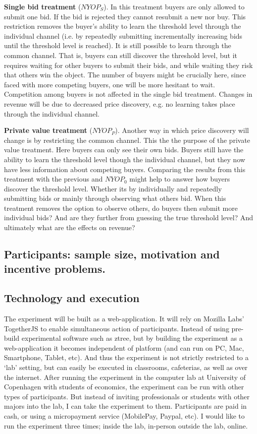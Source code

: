 \documentclass[a4paper,12pt]{article}
\begin{document}
	{\bf Single bid treatment} ($NYOP_S$).
	In this treatment buyers are only allowed to submit one bid. If the bid is rejected they cannot resubmit a new nor buy. This restriction removes the buyer's ability to learn the threshold level through the individual channel (i.e. by repeatedly submitting incrementally increasing bids until the threshold level is reached). It is still possible to learn through the common channel. That is, buyers can still discover the threshold level, but it requires waiting for other buyers to submit their bids, and while waiting they risk that others win the object. The number of buyers might be crucially here, since faced with more competing buyers, one will be more hesitant to wait. Competition among buyers is not affected in the single bid treatment. Changes in revenue will be due to decreased price discovery, e.g. no learning takes place through the individual channel.

	{\bf Private value treatment} ($NYOP_P$).
	Another way in which price discovery will change is by restricting the common channel. This the the purpose of the private value treatment. Here buyers can only see their own bids. Buyers still have the ability to learn the threshold level though the individual channel, but they now have less information about competing buyers. Comparing the results from this treatment with the previous and $NYOP_0$ might help to answer how buyers discover the threshold level. Whether its by individually and repeatedly submitting bids or mainly through observing what others bid. When this treatment removes the option to observe others, do buyers then submit more individual bids? And are they further from guessing the true threshold level? And ultimately what are the effects on revenue? 

	\subsection{Participants: sample size, motivation and incentive problems.}


	\subsection{Technology and execution}
	The experiment will be built as a web-application. It will rely on Mozilla Labs' TogetherJS to enable simultaneous action of participants. Instead of using pre-build experimental software such as ztree, but by building the experiment as a web-application it becomes independent of platform (and can run on PC, Mac, Smartphone, Tablet, etc). And thus the experiment is not strictly restricted to a `lab' setting, but can easily be executed in classrooms, cafeterias, as well as over the internet. After running the experiment in the computer lab at University of Copenhagen with students of economics, the experiment can be run with other types of participants. But instead of inviting professionals or students with other majors into the lab, I can take the experiment to them. Participants are paid in cash, or using a micropayment service (MobilePay, Paypal, etc). I would like to run the experiment three times; inside the lab, in-person outside the lab, online.
\end{document}
